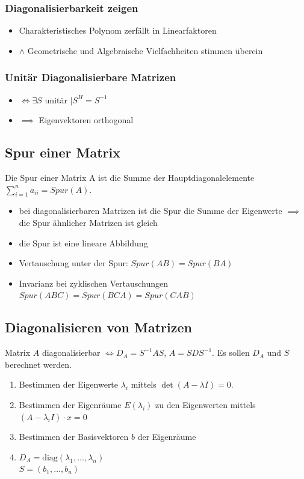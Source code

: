 \subsubsection{Diagonalisierbarkeit zeigen}
\begin{itemize}
    \item Charakteristisches Polynom zerfällt in Linearfaktoren
    \item $\wedge$ Geometrische und Algebraische Vielfachheiten stimmen überein
\end{itemize}

\subsubsection{Unitär Diagonalisierbare Matrizen}
\begin{itemize}
    \item $\iff \exists S$ unitär $\mid S^H=S^{-1}$
    \item $\implies$ Eigenvektoren orthogonal
\end{itemize}

\subsection{Spur einer Matrix}
Die Spur einer Matrix A ist die Summe der Hauptdiagonalelemente\\ $\sum\nolimits_{i=1}^n a_{ii} = Spur(A)$.
\begin{itemize}
    \item bei diagonalisierbaren Matrizen ist die Spur die Summe der Eigenwerte $\implies$ die Spur ähnlicher Matrizen ist gleich
    \item die Spur ist eine lineare Abbildung
    \item Vertauschung unter der Spur: $Spur(AB)=Spur(BA)$
    \item Invarianz bei zyklischen Vertauschungen $Spur(ABC)=Spur(BCA)=Spur(CAB)$
\end{itemize}

\subsection{Diagonalisieren von Matrizen}
Matrix $A$ diagonalisierbar $\iff D_A=S^{-1}AS$, $A=SDS^{-1}$. Es sollen $D_A$ und $S$ berechnet werden.
\begin{enumerate}
    \item Bestimmen der Eigenwerte $\lambda_i$ mittels $\det(A-\lambda I) = 0$.
    \item Bestimmen der Eigenräume $E(\lambda_i)$ zu den Eigenwerten mittels $(A-\lambda_iI)\cdot x = 0$
    \item Bestimmen der Basisvektoren $b$ der Eigenräume
    \item $D_A = \text{diag}(\lambda_1,\dots , \lambda_n)$\\ $S=(b_1,\dots,b_n)$
\end{enumerate}

